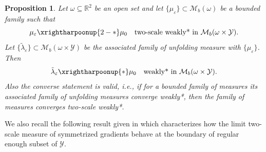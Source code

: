 \documentclass[reqno,10pt]{amsart}
\numberwithin{equation}{section}
\newtheorem{proposition}[theorem]{Proposition}
\theoremstyle{remark}
\newcommand{\calB}{\mathcal{B}}
\newcommand{\calC}{\mathcal{C}}
\newcommand{\calH}{\mathcal{H}}
\newcommand{\calL}{\mathcal{L}}
\newcommand{\R}{\mathbb{R}}
\newcommand{\calY}{\mathcal{Y}}
\newcommand{\weakstar}{\xrightharpoonup{*}}
\newcommand{\weakstartwoscale}{\xrightharpoonup{2-*}}
\newcommand{\eps}{\varepsilon}
\newcommand{\Mb}{\mathcal{M}_b}
\newcommand{\mres}[1]{\lfloor{#1}}
\newcommand{\E}{{\bf E}}
\begin{document}
\begin{proposition} \label{unfolding measure weak* convergence}
Let $\omega \subseteq \R^2$ be an open set and let $\{\mu_\eps\} \subset \Mb(\omega)$ be a bounded family such that
\begin{equation*}
	\mu_\eps \weakstartwoscale \mu_0 \quad \text{two-scale weakly* in $\Mb(\omega \times \calY)$}.
\end{equation*}
Let $\{\tilde{\lambda}_\eps\} \subset \Mb(\omega \times \calY)$ be the associated family of unfolding measure with $\{\mu_\eps\}$. 
Then 
\begin{equation*}
	\tilde{\lambda}_\eps \weakstar \mu_0 \quad \text{weakly* in $\Mb(\omega \times \calY)$}.
\end{equation*}
Also the converse statement is valid, i.e., if for a bounded family of measures its associated family of unfolding measures converge weakly*, then the family of measures converges two-scale weakly*.
\end{proposition}



We also recall the following result given in \cite[Theorem 5.7, Step 1]{Francfort.Giacomini.2014} which characterizes how the limit two-scale measure of symmetrized gradients behave at the boundary of regular enough subset of $\calY$. 
\end{document}
